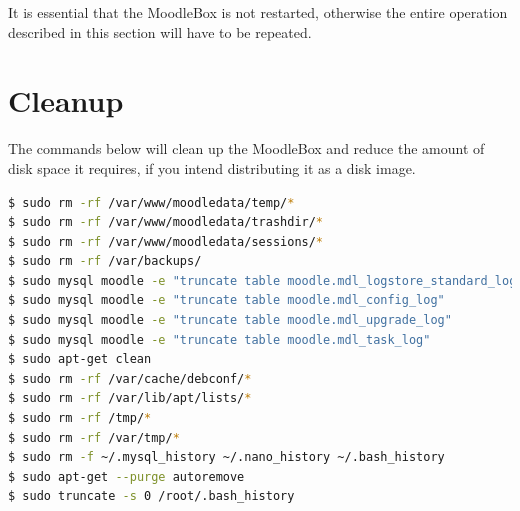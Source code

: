 \documentclass[12pt]{article}
\begin{document}
It is essential that the MoodleBox is not restarted, otherwise the entire operation described in this section will have to be repeated.

\section{Cleanup}

The commands below will clean up the MoodleBox and reduce the amount of disk space it requires, if you intend distributing it as a disk image.

\begin{lstlisting}[language=bash]
$ sudo rm -rf /var/www/moodledata/temp/*
$ sudo rm -rf /var/www/moodledata/trashdir/*
$ sudo rm -rf /var/www/moodledata/sessions/*
$ sudo rm -rf /var/backups/
$ sudo mysql moodle -e "truncate table moodle.mdl_logstore_standard_log"
$ sudo mysql moodle -e "truncate table moodle.mdl_config_log"
$ sudo mysql moodle -e "truncate table moodle.mdl_upgrade_log"
$ sudo mysql moodle -e "truncate table moodle.mdl_task_log"
$ sudo apt-get clean
$ sudo rm -rf /var/cache/debconf/*
$ sudo rm -rf /var/lib/apt/lists/*
$ sudo rm -rf /tmp/*
$ sudo rm -rf /var/tmp/*
$ sudo rm -f ~/.mysql_history ~/.nano_history ~/.bash_history
$ sudo apt-get --purge autoremove
$ sudo truncate -s 0 /root/.bash_history
\end{lstlisting}
\end{document}
